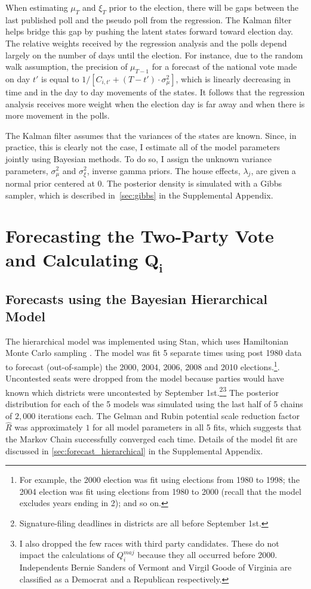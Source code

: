 \documentclass[12pt,final,fleqn]{article}
\theoremstyle{plain}
\begin{document}
When estimating $\mu_T$ and $\xi_T$ prior to the election, there will be gaps between the last published poll and the pseudo poll from the regression. The Kalman filter helps bridge this gap by pushing the latent states forward toward election day. The relative weights received by the regression analysis and the polls depend largely on the number of days until the election. For instance, due to the random walk assumption, the precision of $\mu_{T-1}$ for a forecast of the national vote made on day $t'$ is equal to $1/\left[C_{i,t'} + (T-t')\cdot \sigma^2_\mu\right]$, which is linearly decreasing in time and in the day to day movements of the states. It follows that the regression analysis receives more weight when the election day is far away and when there is more movement in the polls.  

The Kalman filter assumes that the variances of the states are known. Since, in practice, this is clearly not the case, I estimate all of the model parameters jointly using Bayesian methods. To do so, I assign the unknown variance parameters, $\sigma_\mu^2$ and $\sigma_\xi^2$, inverse gamma priors. The house effects, $\lambda_j$, are given a normal prior centered at $0$. The posterior density is simulated with a Gibbs sampler, which is described in~\autoref*{sec:gibbs} in the Supplemental Appendix.

\section{Forecasting the Two-Party Vote and Calculating $\mathbf{Q_i}$}
\subsection{Forecasts using the Bayesian Hierarchical Model} \label{sec: results hierarchical model}
The hierarchical model was implemented using Stan, which uses Hamiltonian Monte Carlo sampling \citep{dev2016rstan}. The model was fit 5 separate times using post 1980 data to forecast (out-of-sample) the 2000, 2004, 2006, 2008 and 2010 elections.\footnote{For example, the 2000 election was fit using elections from 1980 to 1998; the 2004 election was fit using elections from 1980 to 2000 (recall that the model excludes years ending in 2); and so on.}. Uncontested seats were dropped from the model because parties would have known which districts were uncontested by September 1st.\footnote{Signature-filing deadlines in districts are all before September 1st.}\footnote{I also dropped the few races with third party candidates. These do not impact the calculations of $Q_i^{maj}$ because they all occurred before 2000. Independents Bernie Sanders of Vermont and Virgil Goode of Virginia are classified as a Democrat and a Republican respectively. } The posterior distribution for each of the 5 models was simulated using the last half of 5 chains of $2,000$ iterations each. The Gelman and Rubin potential scale reduction factor $\hat{R}$ was approximately $1$ for all model parameters in all 5 fits, which suggests that the Markov Chain successfully converged each time. Details of the model fit are discussed in \autoref*{sec:forecast_hierarchical} in the Supplemental Appendix.
\end{document}
